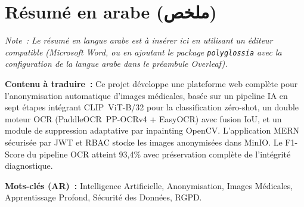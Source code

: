 \section*{Résumé en arabe (ملخص)}

\noindent\textit{Note~: Le résumé en langue arabe est à insérer ici en utilisant un éditeur compatible (Microsoft Word, ou en ajoutant le package \texttt{polyglossia} avec la configuration de la langue arabe dans le préambule Overleaf).}

\vspace{0.5cm}
\noindent\textbf{Contenu à traduire~:} Ce projet développe une plateforme web complète pour l'anonymisation automatique d'images médicales, basée sur un pipeline IA en sept étapes intégrant CLIP~ViT-B/32 pour la classification zéro-shot, un double moteur OCR (PaddleOCR~PP-OCRv4 + EasyOCR) avec fusion IoU, et un module de suppression adaptative par inpainting OpenCV. L'application MERN sécurisée par JWT et RBAC stocke les images anonymisées dans MinIO. Le F1-Score du pipeline OCR atteint 93,4\% avec préservation complète de l'intégrité diagnostique.

\vspace{0.4cm}
\noindent\textbf{Mots-clés (AR)~:} Intelligence Artificielle, Anonymisation, Images Médicales, Apprentissage Profond, Sécurité des Données, RGPD.

\newpage

